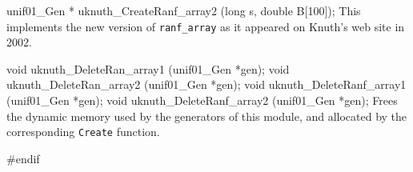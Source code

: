 unif01_Gen * uknuth_CreateRanf_array2 (long s, double B[100]);
\endcode
  \tab  This implements  the new version of {\tt ranf\_array} as it
   appeared on Knuth's web site in 2002. 
  \endtab


\code

void uknuth_DeleteRan_array1  (unif01_Gen *gen);
void uknuth_DeleteRan_array2  (unif01_Gen *gen);
void uknuth_DeleteRanf_array1 (unif01_Gen *gen);
void uknuth_DeleteRanf_array2 (unif01_Gen *gen);
\endcode
 \tab Frees the dynamic memory used by the generators of this module,
  and allocated by the corresponding {\tt Create} function.
 \endtab
\code

\hide
#endif
\endhide
\endcode

